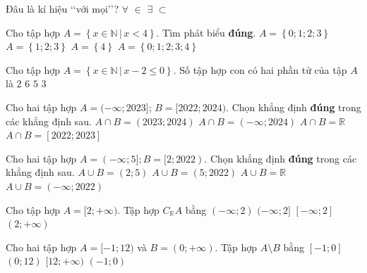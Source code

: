 \begin{ex}%
Đâu là kí hiệu \lq\lq  với mọi\rq\rq ?
	\choice
	{\True $\forall$}
	{$\in$}
	{$\exists$}
	{$\subset$}
	\loigiai{
	}
\end{ex}

\begin{ex}%
Cho tập hợp $A=\left\{x \in \mathbb{N}\,|\, x<4\right\}$. Tìm phát biểu \textbf{đúng}.
	\choice
	{\True $A=\left\{0;1;2;3\right\}$}
	{$A=\left\{1;2;3\right\}$}
	{$A=\left\{4\right\}$}
	{$A=\left\{0;1;2;3;4\right\}$}
\end{ex}

\begin{ex}%
	Cho tập hợp $A=\left\{x \in \mathbb{N}\,|\, x-2\leq 0\right\}$. Số tập hợp con có hai phần tử của tập $A$ là
	\choice
	{$2$}
	{$6$}
	{$5$}
	{\True $3$}
\end{ex}

\begin{ex}%
Cho hai tập hợp $A=(-\infty ; 2023]$; $B=[2022 ; 2024)$. Chọn khẳng định \textbf{đúng} trong các khẳng định sau.
\choice
{$A \cap B=(2023 ; 2024)$}
{$A \cap B=(-\infty ; 2024)$}
{$A \cap B=\mathbb{R}$}
{\True $A \cap B=[2022 ; 2023]$}
\end{ex}

\begin{ex}%
Cho hai tập hợp $A=(-\infty ; 5] ; B=[2 ; 2022)$. Chọn khẳng định \textbf{đúng} trong các khẳng định sau.
\choice
{$A \cup B=(2 ; 5)$}
 {$A \cup B=(5 ; 2022)$}
{$A \cup B=\mathbb{R}$}
{$A \cup B=(-\infty ; 2022)$}
\end{ex}

\begin{ex}%
Cho tập hợp $A=[2 ;+\infty)$. Tập hợp $C_{\mathbb{R}} A$ bằng
	\choice
{\True $(-\infty ; 2)$}
{$(-\infty ; 2]$}
{$[-\infty ; 2]$}
{$(2 ;+\infty)$}
\end{ex}

\begin{ex}%
Cho hai tập hợp $A=[-1 ; 12)$ và $B=(0 ;+\infty)$. Tập hợp $A \setminus B$ bằng
\choice
{\True $[-1 ; 0]$}
{$(0 ; 12)$}
{$[12 ;+\infty)$}
{$(-1 ; 0)$}
\end{ex}

